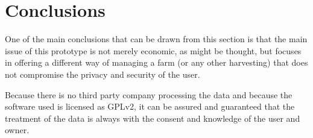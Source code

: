 \section{Conclusions}
One of the main conclusions that can be drawn from this section is that the main issue of this prototype is not merely economic, as might be thought, but focuses in offering a different way of managing a farm (or any other harvesting) that does not compromise the privacy and security of the user.

Because there is no third party company processing the data and because the software used is licensed as GPLv2, it can be assured and guaranteed that the treatment of the data is always with the consent and knowledge of the user and owner.
